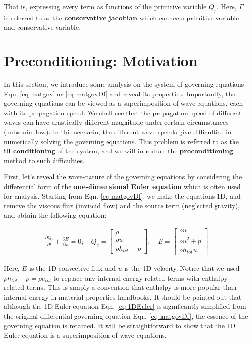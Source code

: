 \documentclass[12pt, letterpaper]{report}
\begin{document}
That is, expressing every term as functions of the primitive variable $Q_p$. Here, $\Gamma$ is referred
to as the {\bf conservative jacobian} which connects primitive variable and conservative variable.
\paraspace

\section{Preconditioning: Motivation}

In this section, we introduce some analysis on the system of governing equations Eqn.
\ref{eq-matgov} or \ref{eq-matgovDf} and reveal its properties. Importantly, the governing equations
can be viewed as a superimposition of wave equations, each with its propagation speed. We shall see
that the propagation speed of different waves can have drastically different magnitude under certain
circumstances (subsonic flow). In this scenario, the different wave speeds give difficulties in
numerically solving the governing equations. This problem is referred to as the {\bf
ill-conditioning} of the system, and we will introduce the {\bf preconditioning} method to such
difficulties.  \paraspace

First, let's reveal the wave-nature of the governing equations by considering the differential form
of the {\bf one-dimensional Euler equation} which is often used for analysis. Starting from Eqn.
\ref{eq-matgovDf}, we make the equations 1D, and remove the viscous flux (inviscid flow) and the
source term (neglected gravity), and obtain the following equation:

\begin{align}\label{eq-1DEuler}
   \frac{\partial Q_c}{\partial t} + \frac{\partial E}{\partial x} = 0; \quad Q_c =
   \begin{bmatrix}\rho \\ \rho u \\ \rho h_{tot} - p\end{bmatrix}; \quad E =
      \begin{bmatrix}\rho u \\ \rho u^2 + p \\ \rho h_{tot} u\end{bmatrix}
\end{align}

Here, $E$ is the 1D convective flux and $u$ is the 1D velocity. Notice that we used $\rho h_{tot} -
p = \rho e_{tot}$ to replace any internal energy related terms with enthalpy related terms. This is
simply a convention that enthalpy is more popular than internal energy in material properties
handbooks. It should be pointed out that although the 1D Euler equation Eqn. \ref{eq-1DEuler} is
significantly simplified from the original differential governing equation Eqn. \ref{eq-matgovDf},
the essence of the governing equation is retained. It will be straightforward to show that the 1D
Euler equation is a superimposition of wave equations.\paraspace
\end{document}
